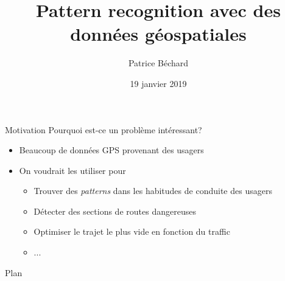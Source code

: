 \documentclass[aspectratio=169]{beamer}
\author{Patrice B\'echard}
\institute[Intact]{
\small{Intact Data Lab} \\
\textit{patrice.bechard@intact.net}
}
\title{Pattern recognition avec des données géospatiales}
\date{19 janvier 2019}
\begin{document}

\begin{frame}[plain, t]
  \titlepage
\end{frame}


\begin{frame}{Motivation}
\centering
{\Large Pourquoi est-ce un problème intéressant?}
\vspace{.5cm}

\begin{itemize}
    \item Beaucoup de données GPS provenant des usagers
    \item On voudrait les utiliser pour
    \begin{itemize}
        \item Trouver des \textit{patterns} dans les habitudes de conduite des usagers
        \item Détecter des sections de routes dangereuses
        \item Optimiser le trajet le plus vide en fonction du traffic
        \item ...
    \end{itemize}
\end{itemize}
    
\end{frame}


\begin{frame}{Plan}
  \tableofcontents
\end{frame}

\end{document}
